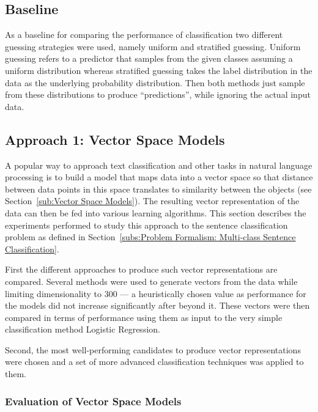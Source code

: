 \subsection{Baseline}
\label{sub:Baseline (Experiments)}

As a baseline for comparing the performance of classification two different guessing strategies were used, namely uniform and stratified guessing.
Uniform guessing refers to a predictor that samples from the given classes assuming a uniform distribution whereas stratified guessing takes the label distribution in the data as the underlying probability distribution.
Then both methods just sample from these distributions to produce ``predictions'', while ignoring the actual input data.


\subsection{Approach 1: Vector Space Models}
\label{sub:Approach 1: Vector Space Models (Experiments)}

A popular way to approach text classification and other tasks in natural language processing is to build a model that maps data into a vector space so that distance between data points in this space translates to similarity between the objects (see Section~\ref{sub:Vector Space Models}). The resulting vector representation of the data can then be fed into various learning algorithms. This section describes the experiments performed to study this approach to the sentence classification problem as defined in Section~\ref{subs:Problem Formalism: Multi-class Sentence Classification}.

First the different approaches to produce such vector representations are compared. Several methods were used to generate vectors from the data while limiting dimensionality to 300 --- a heuristically chosen value as performance for the models did not increase significantly after beyond it. These vectors were then compared in terms of performance using them as input to the very simple classification method Logistic Regression.

Second, the most well-performing candidates to produce vector representations were chosen and a set of more advanced classification techniques was applied to them.


\subsubsection*{Evaluation of Vector Space Models}
\label{subs:Evaluation of Vector Space Models}

